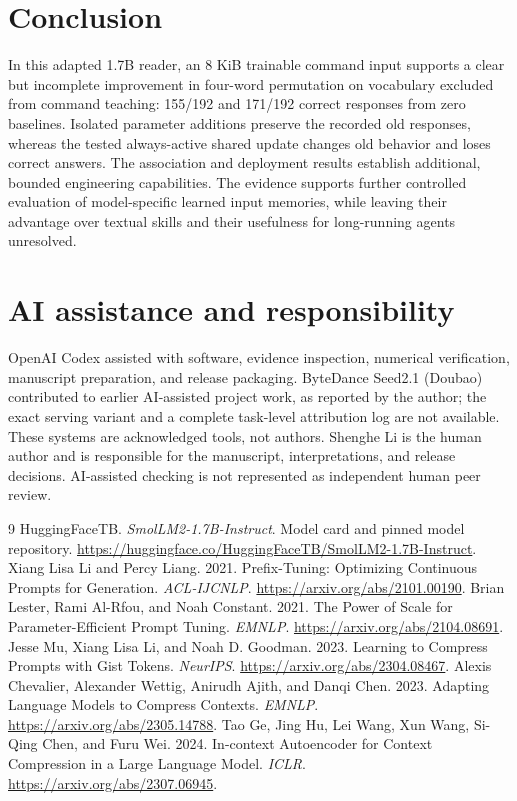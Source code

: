 \documentclass[11pt]{article}
\begin{document}
\section{Conclusion}
In this adapted 1.7B reader, an 8 KiB trainable command input supports a clear but incomplete improvement in four-word permutation on vocabulary excluded from command teaching: 155/192 and 171/192 correct responses from zero baselines. Isolated parameter additions preserve the recorded old responses, whereas the tested always-active shared update changes old behavior and loses correct answers. The association and deployment results establish additional, bounded engineering capabilities. The evidence supports further controlled evaluation of model-specific learned input memories, while leaving their advantage over textual skills and their usefulness for long-running agents unresolved.

\section*{AI assistance and responsibility}
OpenAI Codex assisted with software, evidence inspection, numerical verification, manuscript preparation, and release packaging. ByteDance Seed2.1 (Doubao) contributed to earlier AI-assisted project work, as reported by the author; the exact serving variant and a complete task-level attribution log are not available. These systems are acknowledged tools, not authors. Shenghe Li is the human author and is responsible for the manuscript, interpretations, and release decisions. AI-assisted checking is not represented as independent human peer review.

\begin{thebibliography}{9}
 HuggingFaceTB. \emph{SmolLM2-1.7B-Instruct}. Model card and pinned model repository. \url{https://huggingface.co/HuggingFaceTB/SmolLM2-1.7B-Instruct}.
 Xiang Lisa Li and Percy Liang. 2021. Prefix-Tuning: Optimizing Continuous Prompts for Generation. \emph{ACL-IJCNLP}. \url{https://arxiv.org/abs/2101.00190}.
 Brian Lester, Rami Al-Rfou, and Noah Constant. 2021. The Power of Scale for Parameter-Efficient Prompt Tuning. \emph{EMNLP}. \url{https://arxiv.org/abs/2104.08691}.
 Jesse Mu, Xiang Lisa Li, and Noah D. Goodman. 2023. Learning to Compress Prompts with Gist Tokens. \emph{NeurIPS}. \url{https://arxiv.org/abs/2304.08467}.
 Alexis Chevalier, Alexander Wettig, Anirudh Ajith, and Danqi Chen. 2023. Adapting Language Models to Compress Contexts. \emph{EMNLP}. \url{https://arxiv.org/abs/2305.14788}.
 Tao Ge, Jing Hu, Lei Wang, Xun Wang, Si-Qing Chen, and Furu Wei. 2024. In-context Autoencoder for Context Compression in a Large Language Model. \emph{ICLR}. \url{https://arxiv.org/abs/2307.06945}.
\end{thebibliography}
\end{document}

